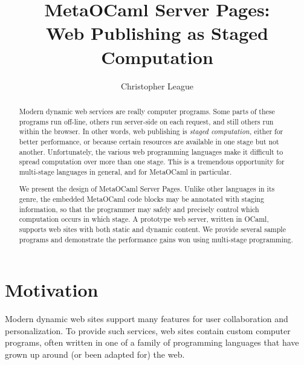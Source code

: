 \documentclass{elsart}
\def\MOC{MetaOCaml\xspace}
\begin{document}
\begin{frontmatter}
\title{\MOC Server Pages:\\Web Publishing as Staged Computation}
\author{Christopher League}
\address{Long Island University \textperiodcentered{} Computer Science\\
  1 University Plaza \textperiodcentered{} Brooklyn, NY 11201\\
  \textup{\texttt{christopher.league@liu.edu}}}

\begin{abstract}
  Modern dynamic web services are really computer programs.  Some
  parts of these programs run off-line, others run server-side on each
  request, and still others run within the browser.  In other words,
  web publishing is \emph{staged computation,} either for better
  performance, or because certain resources are available in one stage
  but not another.  Unfortunately, the various web programming
  languages make it difficult to spread computation over more than one
  stage.  This is a tremendous opportunity for multi-stage languages
  in general, and for \MOC in particular.
  
  We present the design of \MOC Server Pages.  Unlike other languages
  in its genre, the embedded \MOC code blocks may be annotated with
  staging information, so that the programmer may safely and precisely
  control which computation occurs in which stage.  A prototype web
  server, written in OCaml, supports web sites with both static and
  dynamic content.  We provide several sample programs and demonstrate
  the performance gains won using multi-stage programming.
\end{abstract}
\end{frontmatter}


\section{Motivation}
\label{sec:intro}

Modern dynamic web sites support many features for user collaboration
and personalization.  To provide such services, web sites contain
custom computer programs, often written in one of a family of
programming languages that have grown up around (or been adapted for)
the web.
\end{document}
